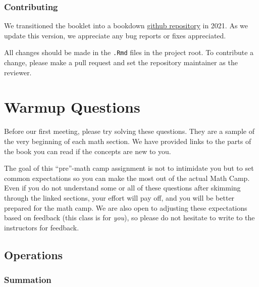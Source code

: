 \documentclass[
  letterpaper,
]{book}
\theoremstyle{definition}
\theoremstyle{definition}
\theoremstyle{plain}
\theoremstyle{definition}
\theoremstyle{plain}
\theoremstyle{plain}
\theoremstyle{remark}
\begin{document}
\hypertarget{contributing}{%
\subsection*{Contributing}\label{contributing}}

We transitioned the booklet into a bookdown
\href{https://github.com/UCSDPoliMathCamp/MathCamp}{github repository}
in 2021. As we update this version, we appreciate any bug reports or
fixes appreciated.

All changes should be made in the \texttt{.Rmd} files in the project
root. To contribute a change, please make a pull request and set the
repository maintainer as the reviewer.


\hypertarget{warmup-questions}{%
\chapter*{Warmup Questions}\label{warmup-questions}}

Before our first meeting, please try solving these questions. They are a
sample of the very beginning of each math section. We have provided
links to the parts of the book you can read if the concepts are new to
you.

The goal of this ``pre''-math camp assignment is not to intimidate you
but to set common expectations so you can make the most out of the
actual Math Camp. Even if you do not understand some or all of these
questions after skimming through the linked sections, your effort will
pay off, and you will be better prepared for the math camp. We are also
open to adjusting these expectations based on feedback (this class is
for \emph{you}), so please do not hesitate to write to the instructors
for feedback.

\hypertarget{operations}{%
\section*{Operations}\label{operations}}

\hypertarget{summation}{%
\subsection*{Summation}\label{summation}}
\end{document}
